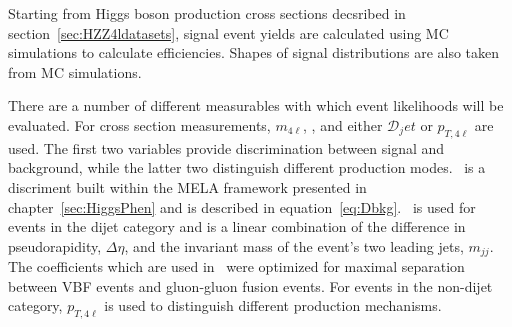 
Starting from Higgs boson production cross sections decsribed in 
section~\ref{sec:HZZ4ldatasets}, signal event yields are calculated
using MC simulations to calculate efficiencies.   Shapes of 
signal distributions are also taken from MC simulations.  

There are a number of different measurables with which event 
likelihoods will be evaluated.  For cross section measurements,
$m_{4\ell}$, \KD, and either $\mathscr{D}_jet$ or $p_{T,4\ell}$ 
are used.  The first two
variables provide discrimination between signal and background,
while the latter two distinguish different production modes.
\KD~is a discriment built within the MELA framework presented 
in chapter~\ref{sec:HiggsPhen} and is described in 
equation~\ref{eq:Dbkg}.
\Djet~is used for events in the dijet category and is a linear 
combination of the difference in pseudorapidity,
$\Delta\eta$, and the invariant mass of the event's two leading 
jets, $m_{jj}$.  The coefficients which are used in \Djet~were 
optimized 
for maximal separation between VBF events and gluon-gluon fusion
events.  For events in the non-dijet category, $p_{T,4\ell}$ is used
to distinguish different production mechanisms.  

